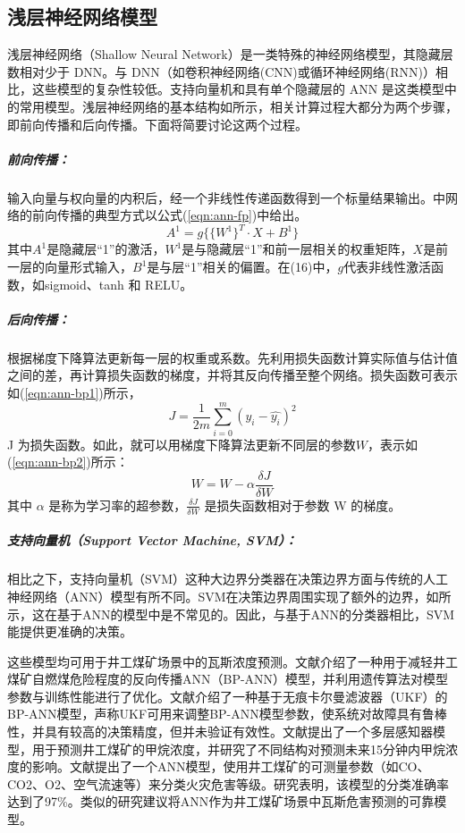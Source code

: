 \documentclass[lang=cn,a4paper,citestyle=gb7714-2015, bibstyle=gb7714-2015]{elegantpaper}
\newcommand{\mycite}[1]{\textsuperscript{\parencite{#1}}}
\begin{document}
    \subsection{浅层神经网络模型}
    浅层神经网络（Shallow Neural Network）是一类特殊的神经网络模型，其隐藏层数相对少于 DNN。与 DNN（如卷积神经网络(CNN)或循环神经网络(RNN)）相比，这些模型的复杂性较低。支持向量机和具有单个隐藏层的 ANN 是这类模型中的常用模型。浅层神经网络的基本结构如所示，相关计算过程大都分为两个步骤，即前向传播和后向传播。下面将简要讨论这两个过程。

    \subparagraph*{前向传播：}输入向量与权向量的内积后，经一个非线性传递函数得到一个标量结果输出。中网络的前向传播的典型方式以公式(\ref{eqn:ann-fp})中给出。
    \begin{equation}
        A^1 = g\{\{W^1\}^T \cdot X+B^1\}
        \label{eqn:ann-fp}
    \end{equation}
    其中$A^1$是隐藏层“1”的激活，$W^1$是与隐藏层“1”和前一层相关的权重矩阵，$X$是前一层的向量形式输入，$B^1$是与层“1”相关的偏置。在(16)中，$g$代表非线性激活函数，如sigmoid、tanh 和 RELU。

    \subparagraph*{后向传播：}根据梯度下降算法更新每一层的权重或系数。先利用损失函数计算实际值与估计值之间的差，再计算损失函数的梯度，并将其反向传播至整个网络。损失函数可表示如(\ref{eqn:ann-bp1})所示，
    \begin{equation}
        J= \dfrac{1}{2m} \sum_{i=0}^{m} (y_i - \hat{y_i})^2
        \label{eqn:ann-bp1}
    \end{equation}
    J 为损失函数。如此，就可以用梯度下降算法更新不同层的参数$W$\mycite{ref77}，表示如(\ref{eqn:ann-bp2})所示：
    \begin{equation}
        W = W - \alpha\frac{\delta J}{\delta W}
        \label{eqn:ann-bp2}
    \end{equation}
    其中 $\alpha$ 是称为学习率的超参数，$\frac{\delta J}{\delta W}$ 是损失函数相对于参数 W 的梯度。

    \subparagraph*{支持向量机（Support Vector Machine, SVM）：}相比之下，支持向量机（SVM）这种大边界分类器在决策边界方面与传统的人工神经网络（ANN）模型有所不同。SVM在决策边界周围实现了额外的边界，如所示，这在基于ANN的模型中是不常见的\mycite{Moraes2013}。因此，与基于ANN的分类器相比，SVM能提供更准确的决策。

    \bigskip
    这些模型均可用于井工煤矿场景中的瓦斯浓度预测。文献\mycite{Xiao2011}介绍了一种用于减轻井工煤矿自燃煤危险程度的反向传播ANN（BP-ANN）模型，并利用遗传算法对模型参数与训练性能进行了优化。文献\mycite{Xu2020}介绍了一种基于无痕卡尔曼滤波器（UKF）的BP-ANN模型，声称UKF可用来调整BP-ANN模型参数，使系统对故障具有鲁棒性，并具有较高的决策精度，但并未验证有效性。文献\mycite{Tutak2019b}提出了一个多层感知器模型，用于预测井工煤矿的甲烷浓度，并研究了不同结构对预测未来15分钟内甲烷浓度的影响。文献\mycite{Barros-Daza2022}提出了一个ANN模型，使用井工煤矿的可测量参数（如CO、CO2、O2、空气流速等）来分类火灾危害等级。研究表明，该模型的分类准确率达到了97\%。类似的研究\mycite{He2010}\mycite{Jo2018}\mycite{Ruilin2010}\mycite{Xie2019}建议将ANN作为井工煤矿场景中瓦斯危害预测的可靠模型。
\end{document}
